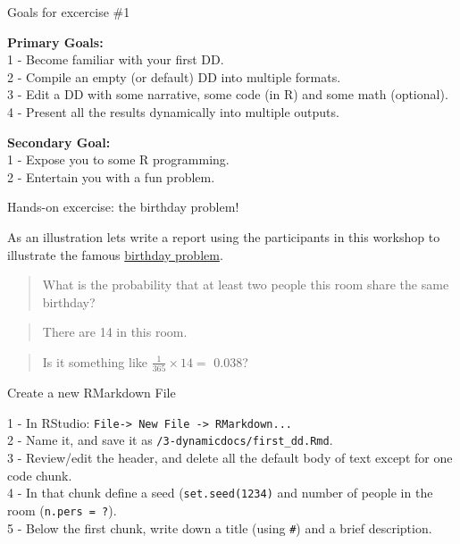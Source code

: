 \documentclass[ignorenonframetext,]{beamer}
\begin{document}
\begin{frame}{Goals for excercise \#1}
\protect\hypertarget{goals-for-excercise-1}{}

\textbf{Primary Goals:}\\
1 - Become familiar with your first DD.\\
2 - Compile an empty (or default) DD into multiple formats.\\
3 - Edit a DD with some narrative, some code (in R) and some math
(optional).\\
4 - Present all the results dynamically into multiple outputs.

\pause

\textbf{Secondary Goal:}\\
1 - Expose you to some R programming.\\
2 - Entertain you with a fun problem.

\end{frame}

\begin{frame}{Hands-on excercise: the birthday problem!}
\protect\hypertarget{hands-on-excercise-the-birthday-problem}{}

As an illustration lets write a report using the participants in this
workshop to illustrate the famous
\href{https://en.wikipedia.org/wiki/Birthday_problem}{birthday problem}.

\begin{quote}
What is the probability that at least two people this room share the
same birthday?
\end{quote}

\begin{quote}
There are 14 in this room.
\end{quote}

\begin{quote}
Is it something like \(\frac{1}{365} \times 14=\) 0.038?
\end{quote}

\end{frame}

\begin{frame}[fragile]{Create a new RMarkdown File}
\protect\hypertarget{create-a-new-rmarkdown-file}{}

1 - In RStudio:
\texttt{File-\textgreater{}\ New\ File\ -\textgreater{}\ RMarkdown...}\\
2 - Name it, and save it as \texttt{/3-dynamicdocs/first\_dd.Rmd}.\\
3 - Review/edit the header, and delete all the default body of text
except for one code chunk.\\
4 - In that chunk define a seed (\texttt{set.seed(1234)} and number of
people in the room (\texttt{n.pers\ =\ ?}).\\
5 - Below the first chunk, write down a title (using \texttt{\#}) and a
brief description.

\end{frame}
\end{document}
